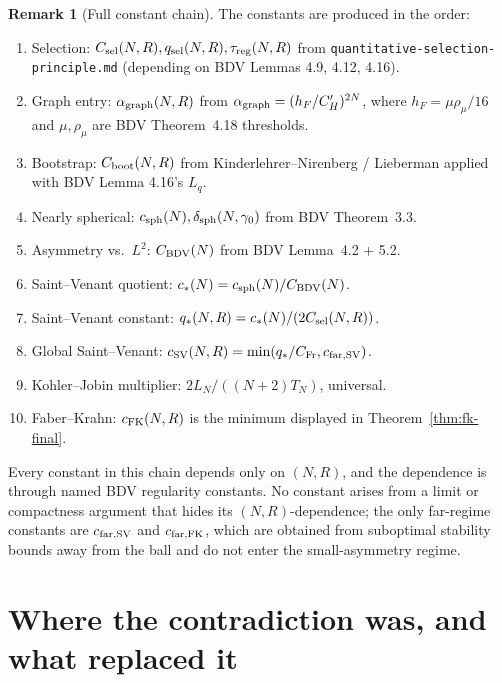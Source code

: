 \documentclass[11pt]{article}
\theoremstyle{definition}
\newtheorem{remark}[theorem]{Remark}
\begin{document}
\begin{remark}[Full constant chain]
The constants are produced in the order:
\begin{enumerate}
\item Selection: $C_{\rm sel}(N,R), q_{\rm sel}(N,R), \tau_{\rm reg}(N,R)$ from
\texttt{quantitative-selection-principle.md} (depending on BDV Lemmas 4.9, 4.12, 4.16).
\item Graph entry: $\alpha_{\rm graph}(N,R)$ from
$\alpha_{\rm graph}=(h_F/C_H')^{2N}$,
where $h_F=\mu\rho_\mu/16$ and $\mu,\rho_\mu$ are BDV Theorem~4.18 thresholds.
\item Bootstrap: $C_{\rm boot}(N,R)$ from Kinderlehrer--Nirenberg /
Lieberman applied with BDV Lemma 4.16's $L_q$.
\item Nearly spherical: $c_{\rm sph}(N), \delta_{\rm sph}(N,\gamma_0)$ from BDV
Theorem~3.3.
\item Asymmetry vs.\ $L^2$: $C_{\rm BDV}(N)$ from BDV Lemma~4.2 + 5.2.
\item Saint--Venant quotient: $c_*(N)=c_{\rm sph}(N)/C_{\rm BDV}(N)$.
\item Saint--Venant constant: $q_*(N,R)=c_*(N)/(2C_{\rm sel}(N,R))$.
\item Global Saint--Venant: $c_{\rm SV}(N,R)=\min(q_*/C_{\rm Fr},c_{\rm far,SV})$.
\item Kohler--Jobin multiplier: $2L_N/((N+2)T_N)$, universal.
\item Faber--Krahn: $c_{\rm FK}(N,R)$ is the minimum displayed in
Theorem~\ref{thm:fk-final}.
\end{enumerate}
Every constant in this chain depends only on $(N,R)$, and the dependence is
through named BDV regularity constants. No constant arises from a limit or
compactness argument that hides its $(N,R)$-dependence; the only
far-regime constants are $c_{\rm far,SV}$ and $c_{\rm far,FK}$, which are
obtained from suboptimal stability bounds away from the ball and do not enter
the small-asymmetry regime.
\end{remark}

\section{Where the contradiction was, and what replaced it}
\end{document}
